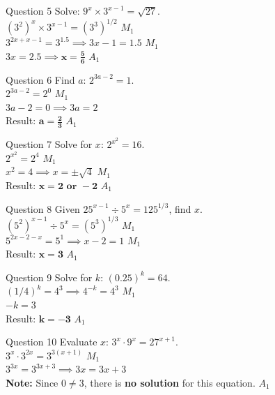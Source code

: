 \documentclass[12pt, a4paper, oneside]{article}
\begin{document}
\begin{solvingbox}{Question 5}
Solve: $9^x \times 3^{x-1} = \sqrt{27}$. \\
$(3^2)^x \times 3^{x-1} = (3^3)^{1/2}$ \hfill $M_1$ \\
$3^{2x+x-1} = 3^{1.5} \implies 3x - 1 = 1.5$ \hfill $M_1$ \\
$3x = 2.5 \implies \mathbf{x = \frac{5}{6}}$ \hfill $A_1$
\end{solvingbox}

\begin{solvingbox}{Question 6}
Find $a$: $2^{3a-2} = 1$. \\
$2^{3a-2} = 2^0$ \hfill $M_1$ \\
$3a - 2 = 0 \implies 3a = 2$ \\
Result: $\mathbf{a = \frac{2}{3}}$ \hfill $A_1$
\end{solvingbox}

\begin{solvingbox}{Question 7}
Solve for $x$: $2^{x^2} = 16$. \\
$2^{x^2} = 2^4$ \hfill $M_1$ \\
$x^2 = 4 \implies x = \pm\sqrt{4}$ \hfill $M_1$ \\
Result: $\mathbf{x = 2 \text{ or } -2}$ \hfill $A_1$
\end{solvingbox}

\begin{solvingbox}{Question 8}
Given $25^{x-1} \div 5^x = 125^{1/3}$, find $x$. \\
$(5^2)^{x-1} \div 5^x = (5^3)^{1/3}$ \hfill $M_1$ \\
$5^{2x-2-x} = 5^1 \implies x - 2 = 1$ \hfill $M_1$ \\
Result: $\mathbf{x = 3}$ \hfill $A_1$
\end{solvingbox}

\begin{solvingbox}{Question 9}
Solve for $k$: $(0.25)^k = 64$. \\
$(1/4)^k = 4^3 \implies 4^{-k} = 4^3$ \hfill $M_1$ \\
$-k = 3$ \\
Result: $\mathbf{k = -3}$ \hfill $A_1$
\end{solvingbox}

\begin{solvingbox}{Question 10}
Evaluate $x$: $3^{x} \cdot 9^{x} = 27^{x+1}$. \\
$3^x \cdot 3^{2x} = 3^{3(x+1)}$ \hfill $M_1$ \\
$3^{3x} = 3^{3x+3} \implies 3x = 3x + 3$ \\
\textbf{Note:} Since $0 \neq 3$, there is \textbf{no solution} for this equation. \hfill $A_1$
\end{solvingbox}
\end{document}

